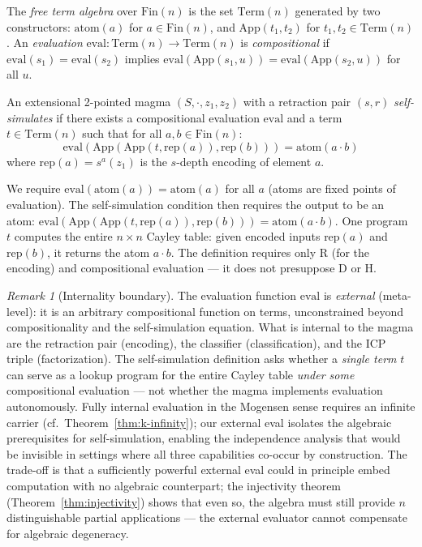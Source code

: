 \documentclass[sigconf,screen,review,anonymous]{acmart}
\newcommand{\dotop}{\cdot}
\newcommand{\Fin}{\mathrm{Fin}}
\theoremstyle{remark}
\newtheorem{remark}{Remark}
\begin{document}
\begin{definition}
The \emph{free term algebra} over $\Fin(n)$ is the set $\text{Term}(n)$ generated by two constructors: $\text{atom}(a)$ for $a \in \Fin(n)$, and $\text{App}(t_1, t_2)$ for $t_1, t_2 \in \text{Term}(n)$. An \emph{evaluation} $\text{eval} : \text{Term}(n) \to \text{Term}(n)$ is \emph{compositional} if $\text{eval}(s_1) = \text{eval}(s_2)$ implies $\text{eval}(\text{App}(s_1, u)) = \text{eval}(\text{App}(s_2, u))$ for all $u$.
\end{definition}

\begin{definition}
\label{def:selfsim}
An extensional 2-pointed magma $(S, \dotop, z_1, z_2)$ with a retraction pair $(s, r)$ \emph{self-simulates} if there exists a compositional evaluation $\text{eval}$ and a term $t \in \text{Term}(n)$ such that for all $a, b \in \Fin(n)$:
\[
\text{eval}(\text{App}(\text{App}(t, \text{rep}(a)), \text{rep}(b))) = \text{atom}(a \dotop b)
\]
where $\text{rep}(a) = s^{a}(z_1)$ is the $s$-depth encoding of element $a$.
\end{definition}

We require $\text{eval}(\text{atom}(a)) = \text{atom}(a)$ for all $a$ (atoms are fixed points of evaluation). The self-simulation condition then requires the output to be an atom: $\text{eval}(\text{App}(\text{App}(t, \text{rep}(a)), \text{rep}(b))) = \text{atom}(a \dotop b)$. One program $t$ computes the entire $n \times n$ Cayley table: given encoded inputs $\text{rep}(a)$ and $\text{rep}(b)$, it returns the atom $a \dotop b$. The definition requires only R (for the encoding) and compositional evaluation --- it does not presuppose D or H.

\begin{remark}[Internality boundary]
\label{rem:eval-external}
The evaluation function $\text{eval}$ is \emph{external} (meta-level): it is an arbitrary compositional function on terms, unconstrained beyond compositionality and the self-simulation equation. What is internal to the magma are the retraction pair (encoding), the classifier (classification), and the ICP triple (factorization). The self-simulation definition asks whether a \emph{single term} $t$ can serve as a lookup program for the entire Cayley table \emph{under some} compositional evaluation --- not whether the magma implements evaluation autonomously. Fully internal evaluation in the Mogensen sense requires an infinite carrier (cf.\ Theorem~\ref{thm:k-infinity}); our external eval isolates the algebraic prerequisites for self-simulation, enabling the independence analysis that would be invisible in settings where all three capabilities co-occur by construction. The trade-off is that a sufficiently powerful external eval could in principle embed computation with no algebraic counterpart; the injectivity theorem (Theorem~\ref{thm:injectivity}) shows that even so, the algebra must still provide $n$ distinguishable partial applications --- the external evaluator cannot compensate for algebraic degeneracy.
\end{remark}
\end{document}
